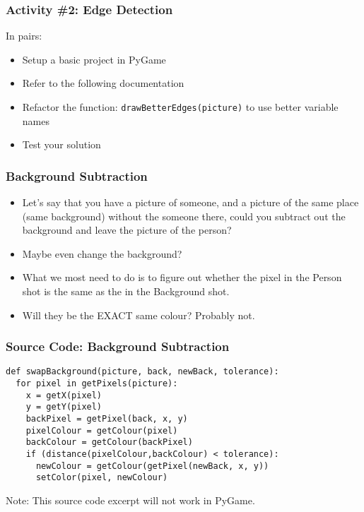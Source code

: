 
\begin{frame}
	\frametitle{Activity \#2: Edge Detection}
	
	In pairs:
	
	\vspace{2em}
	
	\begin{itemize}		
		\item Setup a basic project in PyGame
		\item Refer to the following documentation
		\item Refactor the function: \texttt{drawBetterEdges(picture)} to use better variable names
		\item Test your solution
	\end{itemize}
\end{frame}

\begin{frame}
	\frametitle{Background Subtraction}
	
	\begin{itemize}		
		\item Let's say that you have a picture of someone, and a picture of the same place (same background) without the someone there,
		could you subtract out the background and leave the picture of the person?
		\item Maybe even change the background?
		\item What we most need to do is to figure out whether the pixel in the Person shot is the same as the in the Background shot.
		\item Will they be the EXACT same colour?  Probably not.
	\end{itemize}
\end{frame}

\begin{frame}[fragile]
	\frametitle{Source Code: Background Subtraction}
	
\begin{lstlisting}
def swapBackground(picture, back, newBack, tolerance):
  for pixel in getPixels(picture):
    x = getX(pixel)
    y = getY(pixel)
    backPixel = getPixel(back, x, y)
    pixelColour = getColour(pixel)
    backColour = getColour(backPixel)
    if (distance(pixelColour,backColour) < tolerance):
      newColour = getColour(getPixel(newBack, x, y))
      setColor(pixel, newColour)
\end{lstlisting}

Note: This source code excerpt will not work in PyGame.

\end{frame}

